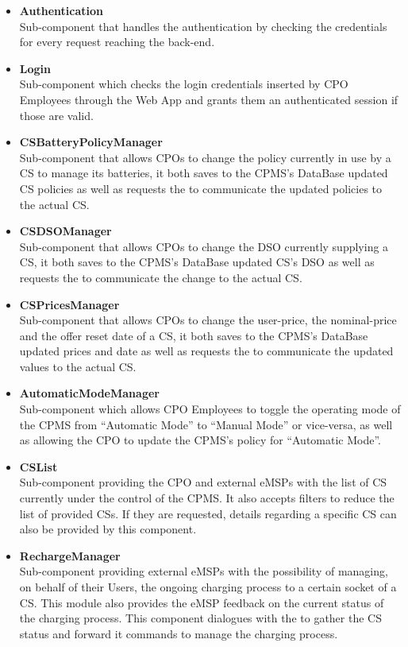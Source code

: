 \documentclass[11pt]{article}
\begin{document}
\begin{itemize}
    \item \textbf{Authentication} \\
        Sub-component that handles the authentication by checking the credentials for every request reaching the back-end.
    \item \textbf{Login} \\
        Sub-component which checks the login credentials inserted by CPO Employees through the Web App and grants them an authenticated session if those are valid.
    \item \textbf{CSBatteryPolicyManager} \\
        Sub-component that allows CPOs to change the policy currently in use by a CS to manage its batteries, it both saves to the CPMS's DataBase updated CS policies as well as requests the  to communicate the updated policies to the actual CS.
    \item \textbf{CSDSOManager} \\
        Sub-component that allows CPOs to change the DSO currently supplying a CS, it both saves to the CPMS's DataBase updated CS's DSO as well as requests the  to communicate the change to the actual CS.
    \item \textbf{CSPricesManager} \\
        Sub-component that allows CPOs to change the user-price, the nominal-price and the offer reset date of a CS, it both saves to the CPMS's DataBase updated prices and date as well as requests the  to communicate the updated values to the actual CS.
    \item \textbf{AutomaticModeManager} \\
        Sub-component which allows CPO Employees to toggle the operating mode of the CPMS from “Automatic Mode” to “Manual Mode” or vice-versa, as well as allowing the CPO to update the CPMS’s policy for “Automatic Mode”.
    \item \textbf{CSList} \\
        Sub-component providing the CPO and external eMSPs with the list of CS currently under the control of the CPMS. It also accepts filters to reduce the list of provided CSs. If they are requested, details regarding a specific CS can also be provided by this component.
    \item \textbf{RechargeManager} \\
        Sub-component providing external eMSPs with the possibility of managing, on behalf of their Users, the ongoing charging process to a certain socket of a CS. This module also provides the eMSP feedback on the current status of the charging process. This component dialogues with the  to gather the CS status and forward it commands to manage the charging process.  

\end{itemize}
\end{document}
